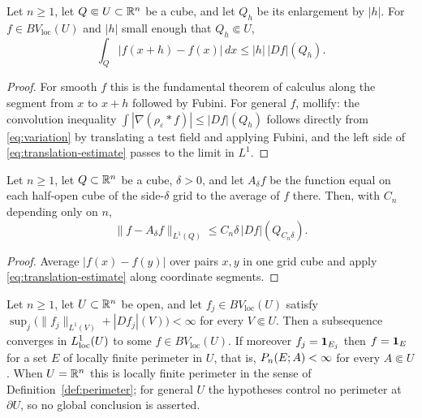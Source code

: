 \begin{lemma}\label{lem:translation-estimate}
Let $n\ge1$, let $Q\Subset U\subset\mathbb R^n$ be a cube, and let $Q_h$ be its
enlargement by $|h|$.  For
$f\in BV_{\mathrm{loc}}(U)$ and $|h|$ small enough that $Q_h\Subset U$,
\begin{equation}\label{eq:translation-estimate}
  \int_Q|f(x+h)-f(x)|\,dx\le|h|\,|Df|(Q_h).
\end{equation}
\end{lemma}

\begin{proof}
For smooth $f$ this is the fundamental theorem of calculus along the segment
from $x$ to $x+h$ followed by Fubini.  For general $f$, mollify: the
convolution inequality $\int|\nabla(\rho_\varepsilon*f)|\le|Df|(Q_h)$ follows
directly from \eqref{eq:variation} by translating a test field and applying
Fubini, and the left side of \eqref{eq:translation-estimate} passes to the
limit in $L^1$.
\end{proof}

\begin{lemma}\label{lem:grid-approx}
Let $n\ge1$, let $Q\subset\mathbb R^n$ be a cube, $\delta>0$, and let
$A_\delta f$ be the function equal on
each half-open cube of the side-$\delta$ grid to the average of $f$ there.
Then, with $C_n$ depending only on $n$,
\begin{equation}\label{eq:grid-approx}
  \|f-A_\delta f\|_{L^1(Q)}\le C_n\delta\,|Df|(Q_{C_n\delta}).
\end{equation}
\end{lemma}

\begin{proof}
Average $|f(x)-f(y)|$ over pairs $x,y$ in one grid cube and apply
\eqref{eq:translation-estimate} along coordinate segments.
\end{proof}

\begin{theorem}\label{thm:bv-compactness}
Let $n\ge1$, let $U\subset\mathbb R^n$ be open, and let
$f_j\in BV_{\mathrm{loc}}(U)$ satisfy
$\sup_j\bigl(\|f_j\|_{L^1(V)}+|Df_j|(V)\bigr)<\infty$ for every $V\Subset U$.
Then a subsequence converges in $L^1_{\mathrm{loc}}(U)$ to some $f\in BV_{\mathrm{loc}}(U)$.
If moreover $f_j=\mathbf 1_{E_j}$ then $f=\mathbf 1_{E}$ for a set $E$ of locally finite
perimeter in $U$, that is, $P_n(E;A)<\infty$ for every $A\Subset U$.
When $U=\mathbb R^n$ this is locally finite perimeter in the sense of
Definition~\ref{def:perimeter}; for general $U$ the hypotheses control no
perimeter at $\partial U$, so no global conclusion is asserted.
\end{theorem}

